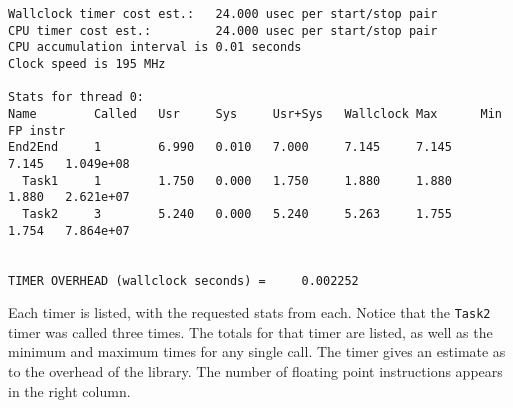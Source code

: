\begin{verbatim}
Wallclock timer cost est.:   24.000 usec per start/stop pair
CPU timer cost est.:         24.000 usec per start/stop pair
CPU accumulation interval is 0.01 seconds
Clock speed is 195 MHz

Stats for thread 0:
Name        Called   Usr     Sys     Usr+Sys   Wallclock Max      Min     FP instr
End2End     1        6.990   0.010   7.000     7.145     7.145    7.145   1.049e+08
  Task1     1        1.750   0.000   1.750     1.880     1.880    1.880   2.621e+07
  Task2     3        5.240   0.000   5.240     5.263     1.755    1.754   7.864e+07


TIMER OVERHEAD (wallclock seconds) =     0.002252

\end{verbatim}

Each timer is listed, with the requested stats from each.  Notice that the {\tt Task2} timer was
called three times.  The totals for that timer are listed, as well as the minimum and maximum
times for any single call.  The timer gives an estimate as to the overhead of the library.  The number
of floating point instructions appears in the right column.
